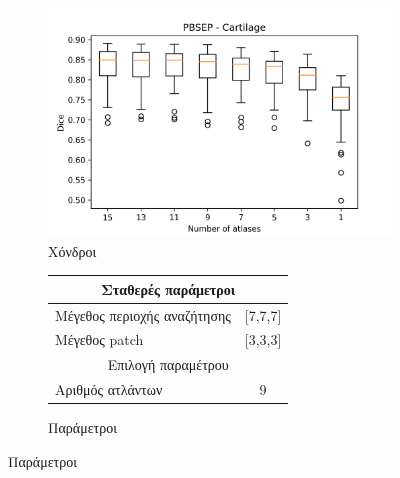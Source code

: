\documentclass{beamer}
\begin{document}
\begin{frame}
\begin{figure}[H]
    \begin{subfigure}[b]{0.42\linewidth}
    \includegraphics[width=\linewidth]{PBSEP_Number_of_atlases_Cartilage_plot.png}
    \caption{Χόνδροι}
    \end{subfigure}
    \begin{subfigure}[b]{0.42\linewidth}
        \begin{tabular}[t]{|l|c|} 
            \multicolumn{2}{c}{\footnotesize Σταθερές παράμετροι} \\
            \hline
            \footnotesize Μέγεθος περιοχής αναζήτησης & \footnotesize  [7,7,7] \\ 
            \hline
            \footnotesize Μέγεθος patch & \footnotesize [3,3,3] \\
            \hline
            \multicolumn{2}{c}{\footnotesize Επιλογή παραμέτρου} \\
            \hline
            \footnotesize Αριθμός ατλάντων & \footnotesize 9 \\ 
            \hline
        \end{tabular}
    \caption{Παράμετροι}
    \end{subfigure}
\end{figure}

\end{frame}
\end{document}
